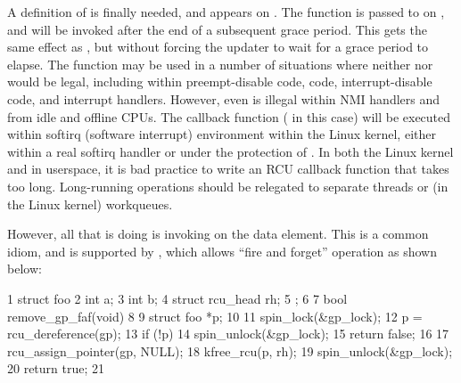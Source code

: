 A definition of  is finally needed, and appears on
\clnrefrange{}{}. %
The function  is passed to 
on \clnref{}, %
and will be invoked after the end of a subsequent grace
period.
This gets the same effect as , but
without forcing the updater to wait for a grace period to elapse.
The
 function may be used in a number of situations where
neither  nor  would
be legal, including within preempt-disable code, 
code, interrupt-disable code, and interrupt handlers.
However, even
 is illegal within NMI handlers and from idle and offline
CPUs.
The callback function ( in this case) will be
executed within softirq (software interrupt) environment within the
Linux kernel, either within a real softirq handler or under the
protection of .
In both the Linux kernel and in
userspace, it is bad practice to write an RCU callback function that
takes too long.
Long-running operations should be relegated to separate
threads or (in the Linux kernel) workqueues.

\QuickQuizEnd

However, all that  is doing is invoking  on
the data element.
This is a common idiom, and is supported by
, which allows ``fire and forget'' operation as shown
below:

\begin{VerbatimN}
       1 struct foo {
       2   int a;
       3   int b;
       4   struct rcu_head rh;
       5 };
       6
       7 bool remove_gp_faf(void)
       8 {
       9   struct foo *p;
      10
      11   spin_lock(&gp_lock);
      12   p = rcu_dereference(gp);
      13   if (!p) {
      14     spin_unlock(&gp_lock);
      15     return false;
      16   }
      17   rcu_assign_pointer(gp, NULL);
      18   kfree_rcu(p, rh);
      19   spin_unlock(&gp_lock);
      20   return true;
      21 }
\end{VerbatimN}

